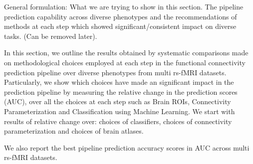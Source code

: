 \documentclass[5p]{elsarticle}
\begin{document}

General formulation: What we are trying to show in this section. The pipeline
prediction capability across diverse phenotypes and the recommendations of
methods at each step which showed significant/consistent impact on diverse
tasks. (Can be removed later).

In this section, we outline the results obtained by systematic comparisons
made on methodological choices employed at each step in the functional
connectivity prediction pipeline over diverse phenotypes from multi
rs-fMRI datasets.
Particularly, we show which choices have made an significant impact in the
prediction pipeline by measuring the relative change in the prediction
scores (AUC), over all the choices at each step such as Brain ROIs,
Connectivity Parameterization and Classification
using Machine Learning. We start with results of relative change over:
choices of classifiers, choices of connectivity parameterization and
choices of brain atlases.

We also report the best pipeline prediction accuracy scores in AUC across
multi rs-fMRI datasets.
\end{document}
